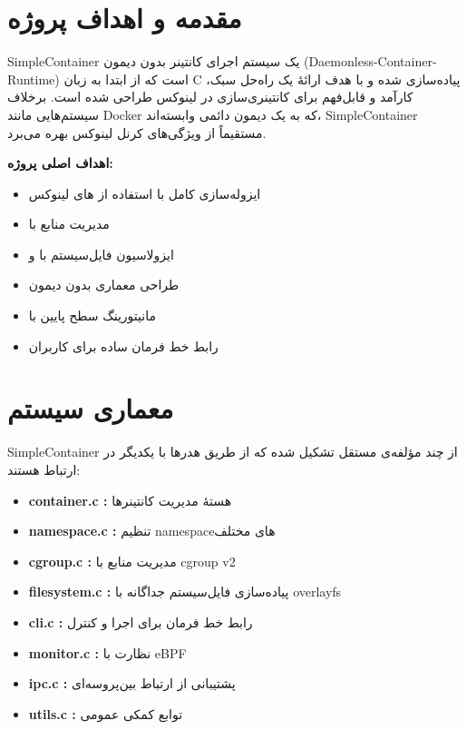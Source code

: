 \documentclass[10pt,a4paper]{article}
\begin{document}


\bigskip


\section{مقدمه و اهداف پروژه}

SimpleContainer یک سیستم اجرای کانتینر بدون دیمون (Daemonless-Container-Runtime) است که از ابتدا به زبان C پیاده‌سازی شده و با هدف ارائهٔ یک راه‌حل سبک، کارآمد و قابل‌فهم برای کانتینری‌سازی در لینوکس طراحی شده است. برخلاف سیستم‌هایی مانند Docker که به یک دیمون دائمی وابسته‌اند، SimpleContainer مستقیماً از ویژگی‌های کرنل لینوکس بهره می‌برد.

\textbf{اهداف اصلی پروژه:}
\begin{itemize}
  \item ایزوله‌سازی کامل با استفاده از های لینوکس
  \item مدیریت منابع با 
  \item ایزولاسیون فایل‌سیستم با  و 
  \item طراحی معماری بدون دیمون
  \item مانیتورینگ سطح پایین با 
  \item رابط خط فرمان ساده برای کاربران
\end{itemize}

\section{معماری سیستم}

SimpleContainer از چند مؤلفه‌ی مستقل تشکیل شده که از طریق هدرها با یکدیگر در ارتباط هستند:

\begin{itemize}
  \item \textbf{container.c :} هستهٔ مدیریت کانتینرها
  \item \textbf{namespace.c :} تنظیم namespaceهای مختلف
  \item \textbf{cgroup.c :} مدیریت منابع با cgroup v2
  \item \textbf{filesystem.c :} پیاده‌سازی فایل‌سیستم جداگانه با overlayfs
  \item \textbf{cli.c :} رابط خط فرمان برای اجرا و کنترل
  \item \textbf{monitor.c :} نظارت با eBPF
  \item \textbf{ipc.c :} پشتیبانی از ارتباط بین‌پروسه‌ای
  \item \textbf{utils.c :} توابع کمکی عمومی
\end{itemize}
\end{document}
